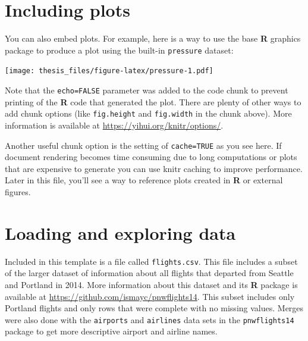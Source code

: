 \documentclass[12pt,twoside]{reedthesis}
\begin{document}
\hypertarget{including-plots}{%
\section{Including plots}\label{including-plots}}

You can also embed plots. For example, here is a way to use the base \textbf{R} graphics package to produce a plot using the built-in \texttt{pressure} dataset:

\texttt{[image: thesis\_files/figure-latex/pressure-1.pdf]}

Note that the \texttt{echo=FALSE} parameter was added to the code chunk to prevent printing of the \textbf{R} code that generated the plot. There are plenty of other ways to add chunk options (like \texttt{fig.height} and \texttt{fig.width} in the chunk above). More information is available at \url{https://yihui.org/knitr/options/}.

Another useful chunk option is the setting of \texttt{cache=TRUE} as you see here. If document rendering becomes time consuming due to long computations or plots that are expensive to generate you can use knitr caching to improve performance. Later in this file, you'll see a way to reference plots created in \textbf{R} or external figures.

\hypertarget{loading-and-exploring-data}{%
\section{Loading and exploring data}\label{loading-and-exploring-data}}

Included in this template is a file called \texttt{flights.csv}. This file includes a subset of the larger dataset of information about all flights that departed from Seattle and Portland in 2014. More information about this dataset and its \textbf{R} package is available at \url{https://github.com/ismayc/pnwflights14}. This subset includes only Portland flights and only rows that were complete with no missing values. Merges were also done with the \texttt{airports} and \texttt{airlines} data sets in the \texttt{pnwflights14} package to get more descriptive airport and airline names.
\end{document}
